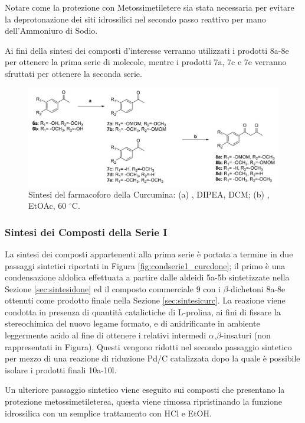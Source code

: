 \documentclass[a4paper, 12pt]{article}
\begin{document}
Notare come la protezione con Metossimetiletere sia stata necessaria per evitare la deprotonazione dei siti idrossilici nel secondo passo reattivo per mano dell'Ammoniuro di Sodio.

Ai fini della sintesi dei composti d'interesse verranno utilizzati i prodotti 8a-8e per ottenere la prima serie di molecole, mentre i prodotti 7a, 7c e 7e  verranno sfruttati per ottenere la seconda serie.

\begin{figure}[H]
	\centering
	\includegraphics[width=\linewidth]{immagini/farmacurc_curcdone.png}
	\caption{Sintesi del farmacoforo della Curcumina: (a) , DIPEA, DCM; (b)  , EtOAc, 60 $^\circ$C.}
	\label{fig:farmacurc_curcdone}
\end{figure}



\subsubsection{Sintesi dei Composti della Serie I}
\label{sec:condserie1}
La sintesi dei composti appartenenti alla prima serie è portata a termine in due passaggi sintetici riportati in Figura \ref{fig:condserie1_curcdone}; il primo è una condensazione aldolica effettuata a partire dalle aldeidi 5a-5b sintetizzate nella Sezione \ref{sec:sintesidone} ed il composto commerciale 9 con i $\beta$-dichetoni 8a-8e ottenuti come prodotto finale nella Sezione \ref{sec:sintesicurc}. La reazione viene condotta in presenza di quantità catalictiche di L-prolina, ai fini di fissare la stereochimica del nuovo legame formato, e di anidrificante  in ambiente leggermente acido al fine di ottenere i relativi intermedi $\alpha$,$\beta$-insaturi (non rappresentati in Figura). Questi	vengono ridotti nel secondo passaggio sintetico per mezzo di una reazione di riduzione Pd/C catalizzata dopo la quale è possibile isolare i prodotti finali 10a-10l.

Un ulteriore passaggio sintetico viene eseguito sui composti che presentano la protezione metossimetileterea, questa viene rimossa ripristinando la funzione idrossilica con un semplice trattamento con HCl e EtOH.
\end{document}
